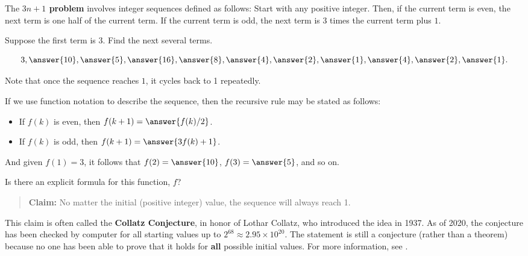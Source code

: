 \documentclass[nooutcomes]{ximera}
\begin{document}
\begin{problem}
The \textbf{$3n+1$ problem} involves integer sequences defined as follows:  Start with any positive integer. Then, if the current term is even, the next term is one half of the current term. If the current term is odd, the next term is $3$ times the current term plus $1$. 

Suppose the first term is 3.  Find the next several terms.  

\[
3, \answer{10}, \answer{5}, \answer{16}, \answer{8}, \answer{4}, \answer{2}, \answer{1}, \answer{4}, \answer{2}, \answer{1}.  
\]

Note that once the sequence reaches $1$, it cycles back to 1 repeatedly.  
\begin{problem}
If we use function notation to describe the sequence, then the recursive rule may be stated as follows: 

\begin{itemize}
\item If $f(k)$ is even, then $f(k+1) = \answer{f(k)/2}$. 
\item If $f(k)$ is odd, then $f(k+1) = \answer{3f(k) + 1}$.  
\end{itemize}

And given $f(1)=3$, it follows that $f(2)=\answer{10}$, $f(3)=\answer{5}$, and so on.  

\begin{problem}
Is there an explicit formula for this function, $f$?  
\begin{multipleChoice}
\end{multipleChoice}
\end{problem}

\begin{feedback}
\begin{quote}
\textbf{Claim:} No matter the initial (positive integer) value, the sequence will always reach 1.  
\end{quote}
This claim is often called the \textbf{Collatz Conjecture}, in honor of Lothar Collatz, who introduced the idea in 1937.  As of 2020, the conjecture has been checked by computer for all starting values up to $2^{68} \approx 2.95\times 10^{20}$. The statement is still a conjecture (rather than a theorem) because no one has been able to prove that it holds for \textbf{all} possible initial values.  For more information, see . 
\end{feedback}

\end{problem}

\end{problem}
\end{document}
